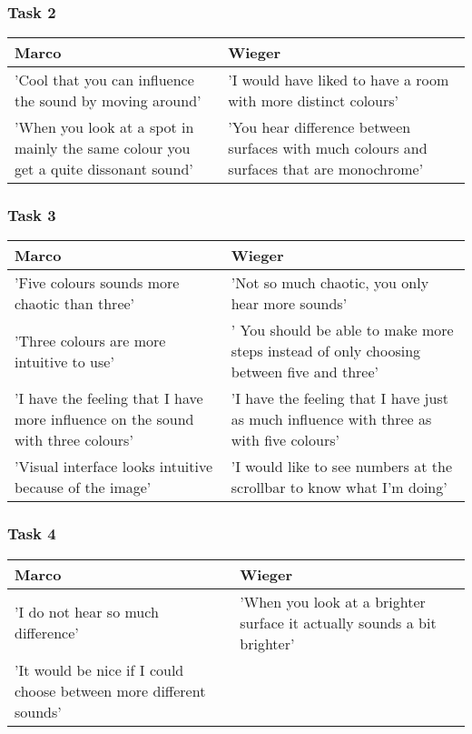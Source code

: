 \documentclass[11pt]{article}
\begin{document}
\subsubsection{Task 2}
\begin{center}
    \begin{tabular}{| p{6cm} | p{6cm} |}
    \hline
  	Marco & Wieger \\ \hline
	'Cool that you can influence the sound by moving around' & 'I would have liked to have a 			room with more distinct colours' \\
	'When you look at a spot in mainly the same colour you get a quite dissonant sound' & 'You 		hear difference between surfaces with much colours and surfaces that are monochrome' \\ 			\hline
    \end{tabular}
\end{center}
\subsubsection{Task 3}
\begin{center}
    \begin{tabular}{| p{6cm} | p{6cm} |}
    \hline
  	Marco & Wieger \\ \hline
	'Five colours sounds more chaotic than three' & 'Not so much chaotic, you only hear more 			sounds'\\
	'Three colours are more intuitive to use'  & ' You should be able to make more steps 				instead of only choosing between five and three' \\
	'I have the feeling that I have more influence on the sound with three colours' & 'I have the 			feeling that I have just as much influence with three as with five colours' \\
	'Visual interface looks intuitive because of the image' & 'I would like to see numbers at the 			scrollbar to know what I'm doing' \\ \hline
    \end{tabular}
\end{center}
\subsubsection{Task 4}
\begin{center}
    \begin{tabular}{| p{6cm} | p{6cm} |}
    \hline
  	Marco & Wieger \\ \hline
	'I do not hear so much difference' & 'When you look at a brighter surface it actually sounds a                bit brighter' \\ 	
	'It would be nice if I could choose between more different sounds' &  \\\hline  		
    \end{tabular}
\end{center}
\end{document}
